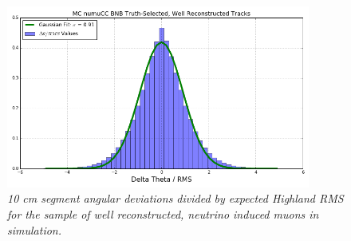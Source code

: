 \begin{figure}[ht!]
\begin{center}
\includegraphics[width=100mm]{Figures/Highland_validation_MCBNBRecoTrack.png}
\end{center}
\caption{\textit{10 cm segment angular deviations divided by expected Highland RMS for the sample of well reconstructed, neutrino induced muons in simulation.}}
\label{Highland_validation_MCBNBRecoTrack_fig}
\end{figure}



